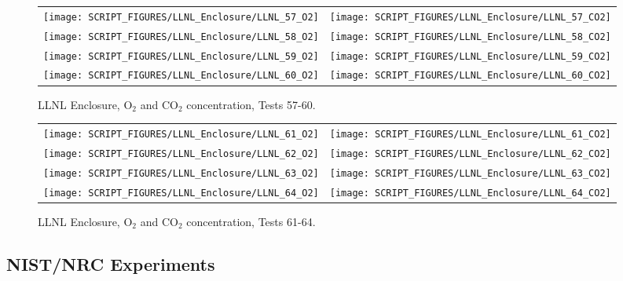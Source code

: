 \begin{figure}[p]
\begin{tabular*}{\textwidth}{l@{\extracolsep{\fill}}r}
\texttt{[image: SCRIPT\_FIGURES/LLNL\_Enclosure/LLNL\_57\_O2]} &
\texttt{[image: SCRIPT\_FIGURES/LLNL\_Enclosure/LLNL\_57\_CO2]} \\
\texttt{[image: SCRIPT\_FIGURES/LLNL\_Enclosure/LLNL\_58\_O2]} &
\texttt{[image: SCRIPT\_FIGURES/LLNL\_Enclosure/LLNL\_58\_CO2]} \\
\texttt{[image: SCRIPT\_FIGURES/LLNL\_Enclosure/LLNL\_59\_O2]} &
\texttt{[image: SCRIPT\_FIGURES/LLNL\_Enclosure/LLNL\_59\_CO2]} \\
\texttt{[image: SCRIPT\_FIGURES/LLNL\_Enclosure/LLNL\_60\_O2]} &
\texttt{[image: SCRIPT\_FIGURES/LLNL\_Enclosure/LLNL\_60\_CO2]}
\end{tabular*}
\caption[LLNL Enclosure, O$_2$ and CO$_2$ concentration, Tests 57-60]{LLNL Enclosure, O$_2$ and CO$_2$ concentration, Tests 57-60.}
\label{LLNL_Gas_15}
\end{figure}

\begin{figure}[p]
\begin{tabular*}{\textwidth}{l@{\extracolsep{\fill}}r}
\texttt{[image: SCRIPT\_FIGURES/LLNL\_Enclosure/LLNL\_61\_O2]} &
\texttt{[image: SCRIPT\_FIGURES/LLNL\_Enclosure/LLNL\_61\_CO2]} \\
\texttt{[image: SCRIPT\_FIGURES/LLNL\_Enclosure/LLNL\_62\_O2]} &
\texttt{[image: SCRIPT\_FIGURES/LLNL\_Enclosure/LLNL\_62\_CO2]} \\
\texttt{[image: SCRIPT\_FIGURES/LLNL\_Enclosure/LLNL\_63\_O2]} &
\texttt{[image: SCRIPT\_FIGURES/LLNL\_Enclosure/LLNL\_63\_CO2]} \\
\texttt{[image: SCRIPT\_FIGURES/LLNL\_Enclosure/LLNL\_64\_O2]} &
\texttt{[image: SCRIPT\_FIGURES/LLNL\_Enclosure/LLNL\_64\_CO2]}
\end{tabular*}
\caption[LLNL Enclosure, O$_2$ and CO$_2$ concentration, Tests 61-64]{LLNL Enclosure, O$_2$ and CO$_2$ concentration, Tests 61-64.}
\label{LLNL_Gas_16}
\end{figure}


\clearpage


\subsection{NIST/NRC Experiments}

